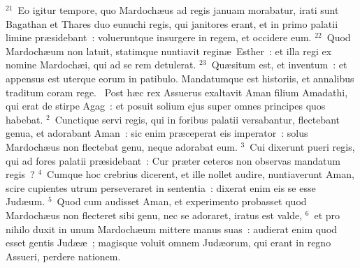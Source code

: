 ${}^{21}$~Eo igitur tempore, quo Mardoch\ae us ad regis januam morabatur, irati sunt Bagathan et Thares duo eunuchi regis, qui janitores erant, et in primo palatii limine pr\ae sidebant~: volueruntque insurgere in regem, et occidere eum.
${}^{22}$~Quod Mardoch\ae um non latuit, statimque nuntiavit regin\ae\ Esther~: et illa regi ex nomine Mardoch\ae i, qui ad se rem detulerat.
${}^{23}$~Qu\ae situm est, et inventum~: et appensus est uterque eorum in patibulo. Mandatumque est historiis, et annalibus traditum coram rege.
~Post h\ae c rex Assuerus exaltavit Aman filium Amadathi, qui erat de stirpe Agag~: et posuit solium ejus super omnes principes quos habebat.
${}^{2}$~Cunctique servi regis, qui in foribus palatii versabantur, flectebant genua, et adorabant Aman~: sic enim pr\ae ceperat eis imperator~: solus Mardoch\ae us non flectebat genu, neque adorabat eum.
${}^{3}$~Cui dixerunt pueri regis, qui ad fores palatii pr\ae sidebant~: Cur pr\ae ter ceteros non observas mandatum regis~?
${}^{4}$~Cumque hoc crebrius dicerent, et ille nollet audire, nuntiaverunt Aman, scire cupientes utrum perseveraret in sententia~: dixerat enim eis se esse Jud\ae um.
${}^{5}$~Quod cum audisset Aman, et experimento probasset quod Mardoch\ae us non flecteret sibi genu, nec se adoraret, iratus est valde,
${}^{6}$~et pro nihilo duxit in unum Mardoch\ae um mittere manus suas~: audierat enim quod esset gentis Jud\ae \ae~; magisque voluit omnem Jud\ae orum, qui erant in regno Assueri, perdere nationem.


